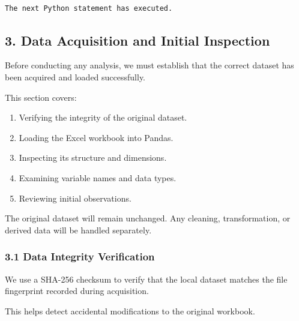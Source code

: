 \documentclass[11pt]{article}
\providecommand{\tightlist}{%
      \setlength{\itemsep}{0pt}\setlength{\parskip}{0pt}}
\begin{document}
    \begin{center}
    \end{center}
    { \hspace*{\fill} \\}
    
    \begin{Verbatim}[commandchars=\\\{\}]
The next Python statement has executed.
    \end{Verbatim}

    \subsection{3. Data Acquisition and Initial
Inspection}\label{data-acquisition-and-initial-inspection}

Before conducting any analysis, we must establish that the correct
dataset has been acquired and loaded successfully.

This section covers:

\begin{enumerate}
\def\labelenumi{\arabic{enumi}.}
\tightlist
\item
  Verifying the integrity of the original dataset.
\item
  Loading the Excel workbook into Pandas.
\item
  Inspecting its structure and dimensions.
\item
  Examining variable names and data types.
\item
  Reviewing initial observations.
\end{enumerate}

The original dataset will remain unchanged. Any cleaning,
transformation, or derived data will be handled separately.

    \subsubsection{3.1 Data Integrity
Verification}\label{data-integrity-verification}

We use a SHA-256 checksum to verify that the local dataset matches the
file fingerprint recorded during acquisition.

This helps detect accidental modifications to the original workbook.
\end{document}
